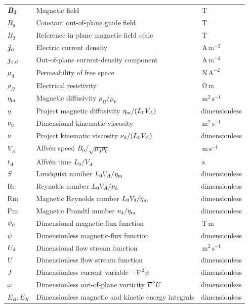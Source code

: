 \documentclass[11pt]{article}
\newcommand{\vect}[1]{\bm{#1}}
\newcommand{\unit}[1]{\,\mathrm{#1}}
\begin{document}
\begin{longtable}{p{}p{}p{}}
$\vect{B}_{\rm d}$ & Magnetic field & $\unit{T}$ \\
$B_g$ & Constant out-of-plane guide field & $\unit{T}$ \\
$B_0$ & Reference in-plane magnetic-field scale & $\unit{T}$ \\
$\vect{j}_{\rm d}$ & Electric current density & $\unit{A\,m^{-2}}$ \\
$j_{z,\rm d}$ & Out-of-plane current-density component & $\unit{A\,m^{-2}}$ \\
$\mu_0$ & Permeability of free space & $\unit{N\,A^{-2}}$ \\
$\rho_\Omega$ & Electrical resistivity & $\unit{\Omega\,m}$ \\
$\eta_{\rm m}$ & Magnetic diffusivity $\rho_\Omega/\mu_0$ & $\unit{m^2\,s^{-1}}$ \\
$\eta$ & Project magnetic diffusivity $\eta_{\rm m}/(L_0V_A)$ & dimensionless \\
$\nu_{\rm d}$ & Dimensional kinematic viscosity & $\unit{m^2\,s^{-1}}$ \\
$\nu$ & Project kinematic viscosity $\nu_{\rm d}/(L_0V_A)$ & dimensionless \\
$V_A$ & Alfv\'en speed $B_0/\sqrt{\mu_0\rho_0}$ & $\unit{m\,s^{-1}}$ \\
$t_A$ & Alfv\'en time $L_0/V_A$ & $\unit{s}$ \\
$S$ & Lundquist number $L_0V_A/\eta_{\rm m}$ & dimensionless \\
$\mathrm{Re}$ & Reynolds number $L_0V_A/\nu_{\rm d}$ & dimensionless \\
$\mathrm{Rm}$ & Magnetic Reynolds number $L_0V_0/\eta_{\rm m}$ & dimensionless \\
$\mathrm{Pm}$ & Magnetic Prandtl number $\nu_{\rm d}/\eta_{\rm m}$ & dimensionless \\
$\psi_{\rm d}$ & Dimensional magnetic-flux function & $\unit{T\,m}$ \\
$\psi$ & Dimensionless magnetic-flux function & dimensionless \\
$U_{\rm d}$ & Dimensional flow stream function & $\unit{m^2\,s^{-1}}$ \\
$U$ & Dimensionless flow stream function & dimensionless \\
$J$ & Dimensionless current variable $-\nabla^2\psi$ & dimensionless \\
$\omega$ & Dimensionless out-of-plane vorticity $\nabla^2U$ & dimensionless \\
$E_B,E_K$ & Dimensionless magnetic and kinetic energy integrals & dimensionless \\

\end{longtable}
\end{document}

